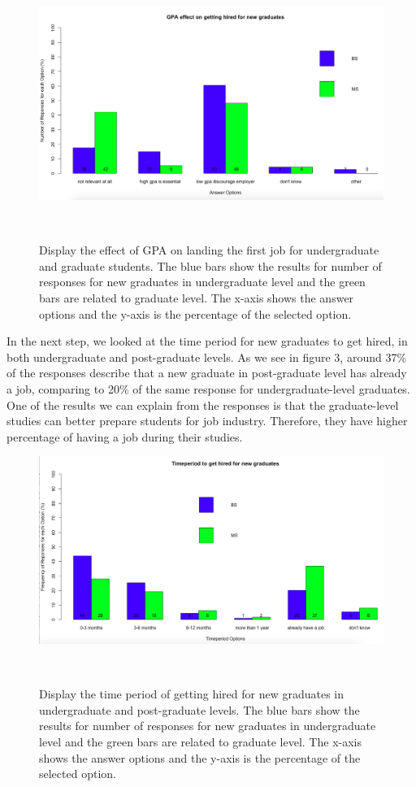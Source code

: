 \documentclass{sigchi}
\begin{document}
\begin{figure}
\centering
  \includegraphics[width=1.05\columnwidth]{figures/gpa_effect_on_hiring_BS_MS}
  \caption{Display the effect of GPA on landing the first job for undergraduate and graduate students. The blue bars show the results for number of responses for new graduates in undergraduate level and the green bars are related to graduate level. The x-axis shows the answer options and the y-axis is the percentage of the selected option.}~\label{fig:figure 2}
\end{figure}

In the next step, we looked at the time period for new graduates to get hired, in both undergraduate and post-graduate levels. As we see in figure 3, around 37\% of the responses describe that a new graduate in post-graduate level has already a job, comparing to 20\% of the same response for undergraduate-level graduates. One of the results we can explain from the responses is that the graduate-level studies can better prepare students for job industry. Therefore, they have higher percentage of having a job during their studies.

\begin{figure}
\centering
  \includegraphics[width=1.05\columnwidth]{figures/timeperiod_to_get_hired_BS_MS}
  \caption{Display the time period of getting hired for new graduates in undergraduate and post-graduate levels. The blue bars show the results for number of responses for new graduates in undergraduate level and the green bars are related to graduate level. The x-axis shows the answer options and the y-axis is the percentage of the selected option.}~\label{fig:figure 3}
\end{figure}
\end{document}

